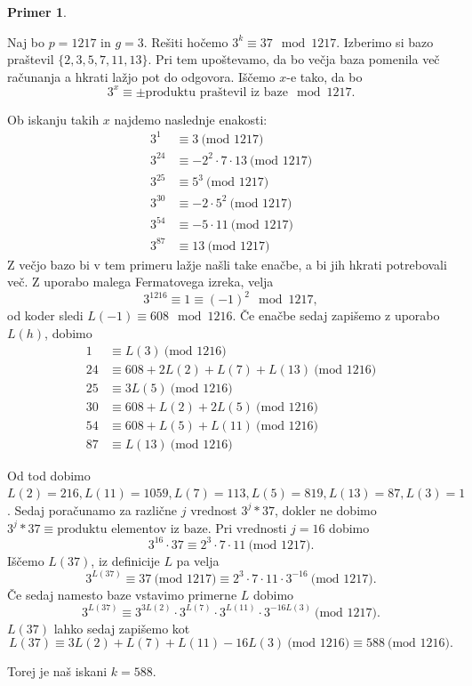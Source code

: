 \documentclass[12pt,a4paper,twoside]{article}
\theoremstyle{definition} %
\newtheorem{primer}[definicija]{Primer}
\theoremstyle{plain} %
\numberwithin{equation}{section}  %
\newcommand{\MOD}[1]{\ \text{(mod }{#1}\text{)}}
\begin{document}
\begin{primer}~

Naj bo $p = 1217$ in $g= 3$. Rešiti hočemo $3^k \equiv 37 \mod 1217$. Izberimo si bazo praštevil $\{ 2,3,5,7,11,13 \}$. Pri tem upoštevamo, da bo večja baza pomenila več računanja a hkrati lažjo pot do odgovora. Iščemo $x$-e  tako, da bo
$$3^x \equiv \pm \text{produktu praštevil iz baze} \mod 1217.$$

Ob iskanju takih $x$ najdemo naslednje enakosti:
\begin{align}
3^1 &\equiv 3 \MOD{1217} \nonumber \\ 
3^{24}  &\equiv -2^2\cdot 7\cdot 13 \MOD{1217} \nonumber \\
3^{25}  &\equiv 5^3 \MOD{1217} \nonumber \\
3^{30}  &\equiv -2 \cdot 5^2 \MOD{1217} \nonumber \\
3^{54}  &\equiv -5\cdot 11 \MOD{1217} \nonumber \\
3^{87}  &\equiv 13 \MOD{1217} \nonumber
\end{align}
Z večjo bazo bi v tem primeru lažje našli take enačbe, a bi jih hkrati potrebovali več.
Z uporabo malega Fermatovega izreka, velja
$$3^{1216} \equiv 1 \equiv (-1)^2 \mod 1217, $$
od koder sledi $L(-1) \equiv 608 \mod 1216$.
Če enačbe sedaj zapišemo z uporabo $L(h)$, dobimo
\begin{align}
1 &\equiv L(3) \MOD{1216} \nonumber \\ 
24&\equiv 608 + 2L(2) + L(7) +L(13) \MOD{1216} \nonumber \\
25 &\equiv 3L(5) \MOD{1216} \nonumber \\
30 &\equiv 608+L(2)+2L(5) \MOD{1216} \nonumber \\
54 &\equiv 608+L(5)+L(11) \MOD{1216} \nonumber \\
87  &\equiv L(13) \MOD{1216}  \nonumber
\end{align}

Od tod dobimo $L(2) = 216, L(11)=1059,L(7) = 113,L(5) = 819,L(13) = 87,L(3)=1$.
Sedaj poračunamo za različne $j$ vrednost $3^j*37$, dokler ne dobimo $3^j*37 \equiv \text{produktu elementov iz baze}$.
Pri vrednosti $j=16$ dobimo
$$3^{16}\cdot 37 \equiv 2^3\cdot 7 \cdot 11 \MOD{1217}.$$
Iščemo $L(37)$, iz definicije $L$ pa velja
$$3^{L(37)} \equiv 37 \MOD{1217} \equiv 2^3\cdot 7 \cdot 11 \cdot 3^{-16}\MOD{1217}.$$
Če sedaj namesto baze vstavimo primerne $L$ dobimo
$$3^{L(37)} \equiv 3^{3L(2)}\cdot 3^{L(7)} \cdot 3^{L(11)} \cdot 3^{-16L(3)}\MOD{1217}.$$
$L(37)$ lahko sedaj zapišemo kot
$$L(37) \equiv 3L(2) +L(7)+L(11) - 16L(3) \MOD{1216} \equiv 588 \MOD{1216}.$$

Torej je naš iskani $k=588$.

\end{primer}
\end{document}
